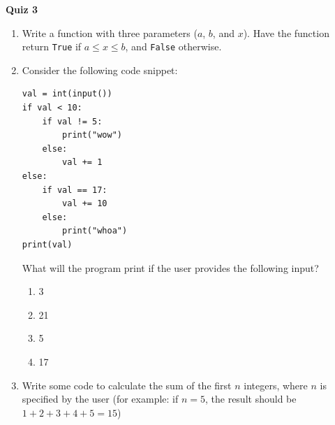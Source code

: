 \documentclass{article}
\begin{document}
\fancyfoot[C]{\thepage}
\vspace*{0cm}
\begin{center}
	{\LARGE \textbf{Quiz 3}}\\
	\vspace{.25cm}
\end{center}

\begin{enumerate}
	\item Write a function with three parameters ($a$, $b$, and $x$). Have the function return \texttt{True} if $a\leq x\leq b$, and \texttt{False} otherwise.
	\vspace{2cm}
	
	\item Consider the following code snippet:
	\begin{lstlisting}
val = int(input())
if val < 10:
	if val != 5:
		print("wow")
	else:
		val += 1
else:
	if val == 17:
		val += 10
	else:
		print("whoa")
print(val)
	\end{lstlisting}
	What will the program print if the user provides the following input?
	\begin{enumerate}
		\item 3
		\item 21
		\item 5
		\item 17
	\end{enumerate}

	\item Write some code to calculate the sum of the first $n$ integers, where $n$ is specified by the user (for example: if $n=5$, the result should be $1+2+3+4+5=15$)
\end{enumerate}
\end{document}
